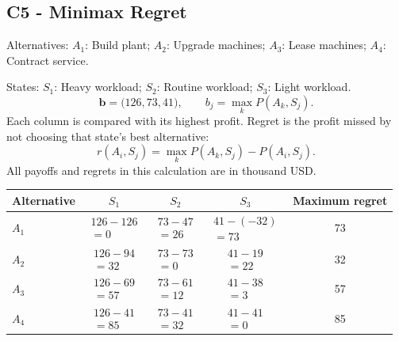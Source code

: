 \subsection*{C5 - Minimax Regret }
\label{sol:laundry-capacity-c5}
Alternatives: $A_1$: Build plant; $A_2$: Upgrade machines; $A_3$: Lease machines; $A_4$: Contract service.\par
States: $S_1$: Heavy workload; $S_2$: Routine workload; $S_3$: Light workload.
\[\boldsymbol{b}=\bigl(126,73,41\bigr),\qquad b_j=\max_k P(A_k,S_j).\]
Each column is compared with its highest profit. Regret is the profit missed by not choosing that state's best alternative:
\[r(A_i,S_j)=\max_k P(A_k,S_j)-P(A_i,S_j).\]
All payoffs and regrets in this calculation are in thousand USD.
\begin{center}
\begin{tabular}{@{}lcccc@{}}\toprule
Alternative & $S_1$ & $S_2$ & $S_3$ & Maximum regret\\\midrule
$A_1$ & $\begin{gathered}126-126\\=0\end{gathered}$ & $\begin{gathered}73-47\\=26\end{gathered}$ & $\begin{gathered}41-(-32)\\=73\end{gathered}$ & 73\\
$A_2$ & $\begin{gathered}126-94\\=32\end{gathered}$ & $\begin{gathered}73-73\\=0\end{gathered}$ & $\begin{gathered}41-19\\=22\end{gathered}$ & 32\\
$A_3$ & $\begin{gathered}126-69\\=57\end{gathered}$ & $\begin{gathered}73-61\\=12\end{gathered}$ & $\begin{gathered}41-38\\=3\end{gathered}$ & 57\\
$A_4$ & $\begin{gathered}126-41\\=85\end{gathered}$ & $\begin{gathered}73-41\\=32\end{gathered}$ & $\begin{gathered}41-41\\=0\end{gathered}$ & 85\\
\bottomrule\end{tabular}
\end{center}
